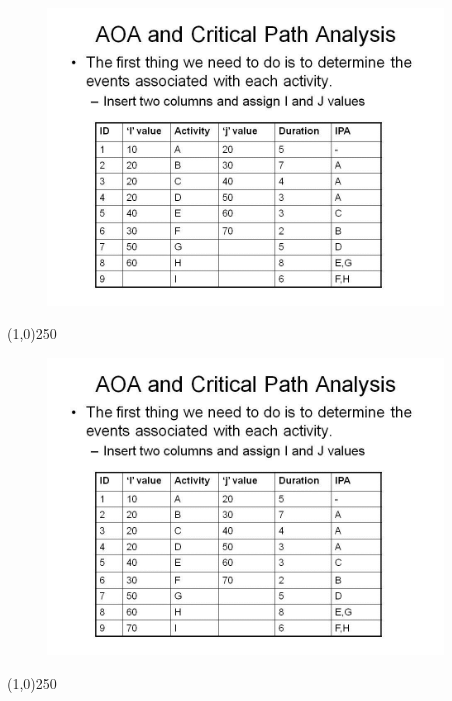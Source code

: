 \begin{frame}
\begin{figure}
	\centering
		\includegraphics[width = 10.5cm]{oldnotes/Slide73.jpg}
\end{figure}
\end{frame}
\begin{center}\line(1,0){250}\end{center}


\begin{frame}
\begin{figure}
	\centering
		\includegraphics[width = 10.5cm]{oldnotes/Slide74.jpg}
\end{figure}
\end{frame}
\begin{center}\line(1,0){250}\end{center}


